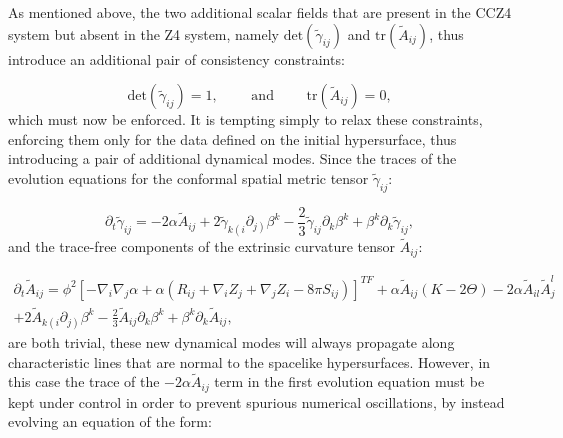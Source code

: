 \documentclass{article}
\begin{document}
As mentioned above, the two additional scalar fields that are present in the CCZ4 system but absent in the Z4 system, namely ${\mathrm{det} \left( \tilde{\gamma}_{i j} \right)}$ and ${\mathrm{tr} \left( \tilde{A}_{i j} \right)}$, thus introduce an additional pair of consistency constraints:

\begin{equation}
\mathrm{det} \left( \tilde{\gamma}_{i j} \right) = 1, \qquad \text{ and } \qquad \mathrm{tr} \left( \tilde{A}_{i j} \right) = 0,
\end{equation}
which must now be enforced. It is tempting simply to relax these constraints, enforcing them only for the data defined on the initial hypersurface, thus introducing a pair of additional dynamical modes\cite{alcubierre5}. Since the traces of the evolution equations for the conformal spatial metric tensor ${\tilde{\gamma}_{i j}}$:

\begin{equation}
\partial_t \tilde{\gamma}_{i j} = -2 \alpha \tilde{A}_{i j} +2 \tilde{\gamma}_{k \left( i \right.} \partial_{\left. j \right)} \beta^k - \frac{2}{3} \tilde{\gamma}_{i j} \partial_k \beta^k + \beta^k \partial_k \tilde{\gamma}_{i j},
\end{equation}
and the trace-free components of the extrinsic curvature tensor ${\tilde{A}_{i j}}$:

\begin{multline}
\partial_t \tilde{A}_{i j} = \phi^2 \left[ - \nabla_i \nabla_j \alpha + \alpha \left( R_{i j} + \nabla_i Z_j + \nabla_j Z_i - 8 \pi S_{i j} \right) \right]^{TF} + \alpha \tilde{A}_{i j} \left( K - 2 \Theta \right) - 2 \alpha \tilde{A}_{i l} \tilde{A}_{j}^{l}\\
+ 2 \tilde{A}_{k \left( i \right.} \partial_{\left. j \right)} \beta^k - \frac{2}{3} \tilde{A}_{i j} \partial_k \beta^k + \beta^k \partial_k \tilde{A}_{i j},
\end{multline}
are both trivial, these new dynamical modes will always propagate along characteristic lines that are normal to the spacelike hypersurfaces. However, in this case the trace of the ${-2 \alpha \tilde{A}_{i j}}$ term in the first evolution equation must be kept under control in order to prevent spurious numerical oscillations, by instead evolving an equation of the form:
\end{document}
